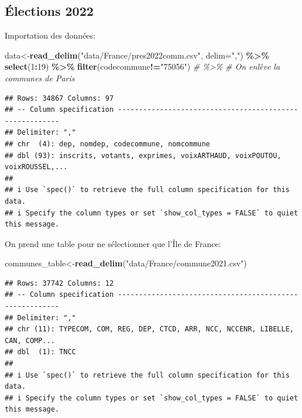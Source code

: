 \documentclass[
]{book}
\newenvironment{Shaded}{\begin{snugshade}}{\end{snugshade}}
\newcommand{\AttributeTok}[1]{\textcolor[rgb]{0.13,0.29,0.53}{#1}}
\newcommand{\CommentTok}[1]{\textcolor[rgb]{0.56,0.35,0.01}{\textit{#1}}}
\newcommand{\DecValTok}[1]{\textcolor[rgb]{0.00,0.00,0.81}{#1}}
\newcommand{\FunctionTok}[1]{\textcolor[rgb]{0.13,0.29,0.53}{\textbf{#1}}}
\newcommand{\NormalTok}[1]{#1}
\newcommand{\OtherTok}[1]{\textcolor[rgb]{0.56,0.35,0.01}{#1}}
\newcommand{\SpecialCharTok}[1]{\textcolor[rgb]{0.81,0.36,0.00}{\textbf{#1}}}
\newcommand{\StringTok}[1]{\textcolor[rgb]{0.31,0.60,0.02}{#1}}
\begin{document}
\hypertarget{uxe9lections-2022}{%
\subsection{Élections 2022}\label{uxe9lections-2022}}

Importation des données:

\begin{Shaded}
\begin{Highlighting}[]
\NormalTok{data}\OtherTok{\textless{}{-}}\FunctionTok{read\_delim}\NormalTok{(}\StringTok{"data/France/pres2022comm.csv"}\NormalTok{, }\AttributeTok{delim=}\StringTok{","}\NormalTok{) }\SpecialCharTok{\%\textgreater{}\%}
  \FunctionTok{select}\NormalTok{(}\DecValTok{1}\SpecialCharTok{:}\DecValTok{19}\NormalTok{) }\SpecialCharTok{\%\textgreater{}\%}
  \FunctionTok{filter}\NormalTok{(codecommune}\SpecialCharTok{!=}\StringTok{"75056"}\NormalTok{) }\CommentTok{\# \%\textgreater{}\% \# On enlève la communes de Paris}
\end{Highlighting}
\end{Shaded}

\begin{verbatim}
## Rows: 34867 Columns: 97
## -- Column specification --------------------------------------------------------
## Delimiter: ","
## chr  (4): dep, nomdep, codecommune, nomcommune
## dbl (93): inscrits, votants, exprimes, voixARTHAUD, voixPOUTOU, voixROUSSEL,...
## 
## i Use `spec()` to retrieve the full column specification for this data.
## i Specify the column types or set `show_col_types = FALSE` to quiet this message.
\end{verbatim}

On prend une table pour ne sélectionner que l'Île de France:

\begin{Shaded}
\begin{Highlighting}[]
\NormalTok{communes\_table}\OtherTok{\textless{}{-}}\FunctionTok{read\_delim}\NormalTok{(}\StringTok{"data/France/commune2021.csv"}\NormalTok{)}
\end{Highlighting}
\end{Shaded}

\begin{verbatim}
## Rows: 37742 Columns: 12
## -- Column specification --------------------------------------------------------
## Delimiter: ","
## chr (11): TYPECOM, COM, REG, DEP, CTCD, ARR, NCC, NCCENR, LIBELLE, CAN, COMP...
## dbl  (1): TNCC
## 
## i Use `spec()` to retrieve the full column specification for this data.
## i Specify the column types or set `show_col_types = FALSE` to quiet this message.
\end{verbatim}
\end{document}
